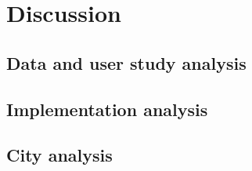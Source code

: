 \section{Discussion}
\subsection{Data and user study analysis}
\subsection{Implementation analysis}
\subsection{City analysis}